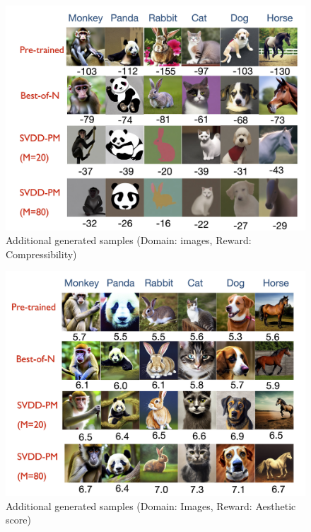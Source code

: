 \begin{figure}[!th]
    \centering
    \includegraphics[width=1.0\linewidth]{images/Images_comp.jpg}  %
    \caption{Additional generated samples (Domain: images, Reward: Compressibility)}
    \label{fig:images1}
\end{figure}

\begin{figure}[!th]
    \centering
    \includegraphics[width=1.0\linewidth]{images/Images_asthetic.jpg}  %
    \caption{Additional generated samples (Domain: Images, Reward: Aesthetic score)}
    \label{fig:images2}
\end{figure}

